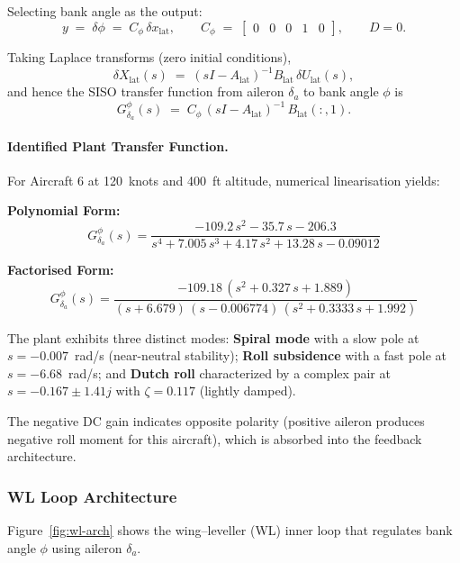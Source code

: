 Selecting bank angle as the output:
\[
y \;=\; \delta\phi \;=\; C_\phi\,\delta x_{\mathrm{lat}},
\qquad
C_\phi \;=\; \begin{bmatrix} 0 & 0 & 0 & 1 & 0 \end{bmatrix},
\qquad D=0.
\]

Taking Laplace transforms (zero initial conditions),
\[
\delta X_{\mathrm{lat}}(s) \;=\; (sI - A_{\mathrm{lat}})^{-1} B_{\mathrm{lat}} \,\delta U_{\mathrm{lat}}(s),
\]
and hence the SISO transfer function from aileron \(\delta_a\) to bank angle \(\phi\) is
\[
G^{\phi}_{\delta_a}(s)
\;=\;
C_\phi \,(sI - A_{\mathrm{lat}})^{-1}\, B_{\mathrm{lat}}(:,1).
\]

\paragraph{Identified Plant Transfer Function.}
For Aircraft 6 at 120~knots and 400~ft altitude, numerical linearisation yields:

\textbf{Polynomial Form:}
\begin{equation}
G^{\phi}_{\delta_a}(s)
= \frac{-109.2\,s^{2} - 35.7\,s - 206.3}
        {s^{4} + 7.005\,s^{3} + 4.17\,s^{2} + 13.28\,s - 0.09012}
\label{eq:Gphi_poly}
\end{equation}

\textbf{Factorised Form:}
\begin{equation}
G^{\phi}_{\delta_a}(s)
= \frac{-109.18\,(s^{2} + 0.327\,s + 1.889)}
        {(s+6.679)\,(s-0.006774)\,(s^{2} + 0.3333\,s + 1.992)}
\label{eq:Gphi_zpk}
\end{equation}

The plant exhibits three distinct modes: \textbf{Spiral mode} with a slow pole at $s=-0.007$~rad/s (near-neutral stability); \textbf{Roll subsidence} with a fast pole at $s=-6.68$~rad/s; and \textbf{Dutch roll} characterized by a complex pair at $s = -0.167 \pm 1.41j$ with $\zeta=0.117$ (lightly damped).

The negative DC gain indicates opposite polarity (positive aileron produces negative roll moment for this aircraft), which is absorbed into the feedback architecture.

\subsubsection{WL Loop Architecture}

Figure~\ref{fig:wl-arch} shows the wing–leveller (WL) inner loop that regulates
bank angle $\phi$ using aileron $\delta_a$.

